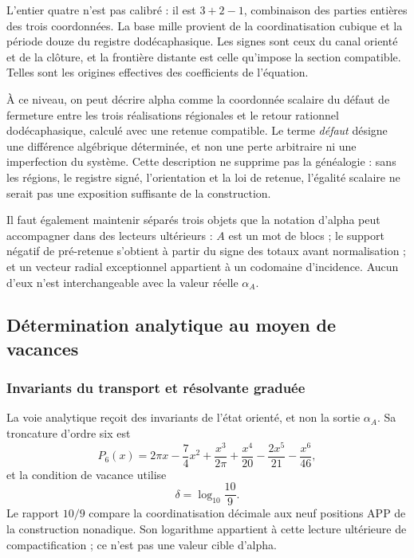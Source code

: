 L'entier quatre n'est pas calibré : il est
\(3+2-1\), combinaison des parties entières des trois coordonnées.
La base mille provient de la coordinatisation cubique et la période douze du registre dodécaphasique. Les
signes sont ceux du canal orienté et de la clôture, et la frontière distante est
celle qu'impose la section compatible. Telles sont les origines effectives des
coefficients de l'équation.

À ce niveau, on peut décrire alpha comme la coordonnée scalaire du défaut de fermeture entre les trois réalisations régionales et le retour rationnel dodécaphasique, calculé avec une retenue compatible. Le terme \emph{défaut} désigne une différence algébrique déterminée, et non une perte arbitraire ni une imperfection du système. Cette description ne supprime pas la généalogie : sans les régions, le registre signé, l'orientation et la loi de retenue, l'égalité scalaire ne serait pas une exposition suffisante de la construction.

Il faut également maintenir séparés trois objets que la notation d'alpha peut accompagner dans des lecteurs ultérieurs : \(A\) est un mot de blocs ; le support négatif de pré-retenue s'obtient à partir du signe des totaux avant normalisation ; et un vecteur radial exceptionnel appartient à un codomaine d'incidence. Aucun d'eux n'est interchangeable avec la valeur réelle \(\alpha_A\).






\subsection{Détermination analytique au moyen de vacances}
\subsubsection{Invariants du transport et résolvante graduée}
\label{subsec:alpha-via-b}

La voie analytique reçoit des invariants de l'état orienté, et non la sortie
\(\alpha_A\). Sa troncature d'ordre six est
\begin{equation}
 P_6(x)=2\pi x-\frac74x^2
 +\frac{x^3}{2\pi}
 +\frac{x^4}{20}-\frac{2x^5}{21}-\frac{x^6}{46},
 \label{eq:alpha-p6}
\end{equation}
et la condition de vacance utilise
\[
 \delta=\log_{10}\frac{10}{9}.
\]
Le rapport \(10/9\) compare la coordinatisation décimale aux neuf positions
APP de la construction nonadique. Son logarithme appartient à cette lecture
ultérieure de compactification ; ce n'est pas une valeur cible d'alpha.


